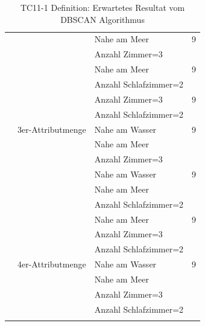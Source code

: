 \begin{longtable}{ | l | l | l | l |}
	& & \tabitem Nahe am Meer & 9 \\
	& & \tabitem Anzahl Zimmer=3 & \\ \cline{3-4} 
	& & \tabitem Nahe am Meer & 9 \\
	& & \tabitem Anzahl Schlafzimmer=2 & \\ \cline{3-4} 

	& & \tabitem Anzahl Zimmer=3 & 9 \\
	& & \tabitem Anzahl Schlafzimmer=2 & \\ \cline{2-4} 

	& 3er-Attributmenge & \tabitem Nahe am Wasser & 9 \\
	& & \tabitem Nahe am Meer & \\ 
	& & \tabitem Anzahl Zimmer=3 & \\ \cline{3-4} 
	& & \tabitem Nahe am Wasser & 9 \\
	& & \tabitem Nahe am Meer & \\ 
	& & \tabitem Anzahl Schlafzimmer=2 & \\ \cline{3-4}
	& & \tabitem Nahe am Meer & 9 \\
	& & \tabitem Anzahl Zimmer=3 & \\ 
	& & \tabitem Anzahl Schlafzimmer=2 & \\ \cline{2-4}

	& 4er-Attributmenge & \tabitem Nahe am Wasser & 9 \\
	& & \tabitem Nahe am Meer & \\ 
	& & \tabitem Anzahl Zimmer=3 & \\ 
	& & \tabitem Anzahl Schlafzimmer=2 & \\ \hline

	\caption{TC11-1 Definition: Erwartetes Resultat vom DBSCAN Algorithmus}
	\centering
	\label{fig:recherche:testcases:11:1}
\end{longtable}

